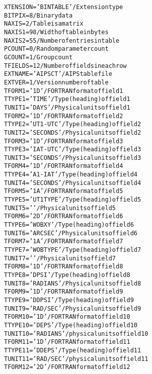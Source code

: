 \documentclass[twoside]{article}
\begin{document}
\begin{alltt}
XTENSION= 'BINTABLE'           / Extension type
BITPIX  =                    8 / Binary data
NAXIS   =                    2 / Table is a matrix
NAXIS1  =                   98 / Width of table in bytes
NAXIS2  =                   55 / Number of entries in table
PCOUNT  =                    0 / Random parameter count
GCOUNT  =                    1 / Group count
TFIELDS =                   12 / Number of fields in each row
EXTNAME = 'AIPS CT '           / AIPS table file
EXTVER  =                    1 / Version number of table
TFORM1  = '1D      '           / FORTRAN format of field  1
TTYPE1  = 'TIME            '   / Type (heading) of field  1
TUNIT1  = 'DAYS    '           / Physical units of field  1
TFORM2  = '1D      '           / FORTRAN format of field  2
TTYPE2  = 'UT1-UTC         '   / Type (heading) of field  2
TUNIT2  = 'SECONDS '           / Physical units of field  2
TFORM3  = '1D      '           / FORTRAN format of field  3
TTYPE3  = 'IAT-UTC         '   / Type (heading) of field  3
TUNIT3  = 'SECONDS '           / Physical units of field  3
TFORM4  = '1D      '           / FORTRAN format of field  4
TTYPE4  = 'A1-IAT          '   / Type (heading) of field  4
TUNIT4  = 'SECONDS '           / Physical units of field  4
TFORM5  = '1A      '           / FORTRAN format of field  5
TTYPE5  = 'UT1 TYPE        '   / Type (heading) of field  5
TUNIT5  = '        '           / Physical units of field  5
TFORM6  = '2D      '           / FORTRAN format of field  6
TTYPE6  = 'WOBXY           '   / Type (heading) of field  6
TUNIT6  = 'ARCSEC  '           / Physical units of field  6
TFORM7  = '1A      '           / FORTRAN format of field  7
TTYPE7  = 'WOB TYPE        '   / Type (heading) of field  7
TUNIT7  = '        '           / Physical units of field  7
TFORM8  = '1D      '           / FORTRAN format of field  8
TTYPE8  = 'DPSI            '   / Type (heading) of field  8
TUNIT8  = 'RADIANS '           / Physical units of field  8
TFORM9  = '1D      '           / FORTRAN format of field  9
TTYPE9  = 'DDPSI           '   / Type (heading) of field  9
TUNIT9  = 'RAD/SEC '           / Physical units of field  9
TFORM10 = '1D      '           / FORTRAN format of field 10
TTYPE10 = 'DEPS            '   / Type (heading) of field 10
TUNIT10 = 'RADIANS '           / physical units of field 10
TFORM11 = '1D      '           / FORTRAN format of field 11
TTYPE11 = 'DDEPS           '   / Type (heading) of field 11
TUNIT11 = 'RAD/SEC '           / physical units of field 11
TFORM12 = '2D      '           / FORTRAN format of field 12

\end{alltt}
\end{document}
